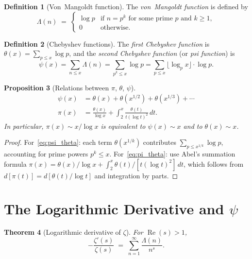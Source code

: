 \documentclass[12pt,a4paper]{amsart}
\newtheorem{theorem}{Theorem}[section]
\newtheorem{proposition}[theorem]{Proposition}
\theoremstyle{definition}
\newtheorem{definition}[theorem]{Definition}
\DeclareMathOperator{\Re}{Re}
\begin{document}
\begin{definition}[Von~Mangoldt function]
\label{def:mangoldt}
The \emph{von~Mangoldt function} is defined by
\[
  \Lambda(n) \;=\;
  \begin{cases}
    \log p & \text{if } n = p^k \text{ for some prime } p \text{ and } k \ge 1, \\
    0      & \text{otherwise.}
  \end{cases}
\]
\end{definition}

\begin{definition}[Chebyshev functions]
\label{def:chebyshev}
The \emph{first Chebyshev function} is
$\theta(x) = \sum_{p \le x} \log p$,
and the \emph{second Chebyshev function} (or \emph{psi function}) is
\[
  \psi(x) = \sum_{n \le x} \Lambda(n) = \sum_{p^k \le x} \log p
           = \sum_{p \le x} \lfloor\log_p x\rfloor \cdot \log p.
\]
\end{definition}

\begin{proposition}[Relations between $\pi$, $\theta$, $\psi$]
\label{prop:psi_theta_pi}
\begin{align}
  \psi(x) &= \theta(x) + \theta(x^{1/2}) + \theta(x^{1/3}) + \cdots
  \label{eq:psi_theta} \\
  \pi(x) &= \frac{\theta(x)}{\log x} + \int_2^x \frac{\theta(t)}{t(\log t)^2}\,dt.
  \label{eq:pi_theta}
\end{align}
In particular, $\pi(x) \sim x/\log x$ is equivalent to $\psi(x) \sim x$
and to $\theta(x) \sim x$.
\end{proposition}

\begin{proof}
For~\eqref{eq:psi_theta}: each term $\theta(x^{1/k})$ contributes
$\sum_{p \le x^{1/k}} \log p$, accounting for prime powers $p^k \le x$.
For~\eqref{eq:pi_theta}: use Abel's summation formula
$\pi(x) = \theta(x)/\log x + \int_2^x \theta(t)/[t(\log t)^2]\,dt$,
which follows from $d[\pi(t)] = d[\theta(t)/\log t]$ and integration by parts.
\end{proof}

\section{The Logarithmic Derivative and \texorpdfstring{$\psi$}{psi}}

\begin{theorem}[Logarithmic derivative of $\zeta$]
\label{thm:log_deriv}
For $\Re(s) > 1$,
\[
  -\frac{\zeta'(s)}{\zeta(s)} \;=\; \sum_{n=1}^{\infty} \frac{\Lambda(n)}{n^s}.
\]
\end{theorem}
\end{document}
